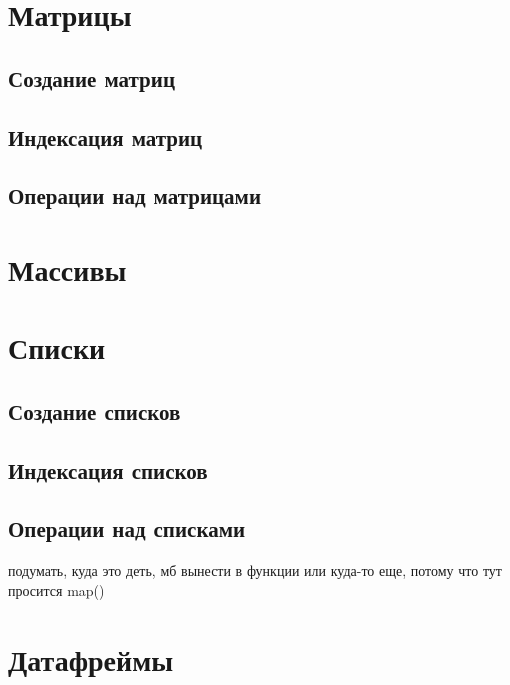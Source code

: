 \documentclass[
  letterpaper,
  DIV=11,
  numbers=noendperiod]{scrreprt}
\theoremstyle{definition}
\theoremstyle{remark}
\begin{document}
\section{Матрицы}\label{rdstructs-matrices}

\subsection{Создание матриц}\label{rdstructs-matrices-creation}

\subsection{Индексация матриц}\label{rdstructs-matrices-indexing}

\subsection{Операции над
матрицами}\label{rdstructs-matrices-manipulations}

\section{Массивы}\label{rdstructs-arrays}

\section{Списки}\label{rdstructs-lists}

\subsection{Создание списков}\label{rdstructs-lists-creation}

\subsection{Индексация списков}\label{rdstructs-lists-indexing}

\subsection{Операции над списками}\label{rdstructs-lists-manipulations}

подумать, куда это деть, мб вынести в функции или куда-то еще, потому
что тут просится map()

\section{Датафреймы}\label{rdstructs-dataframes}
\end{document}
